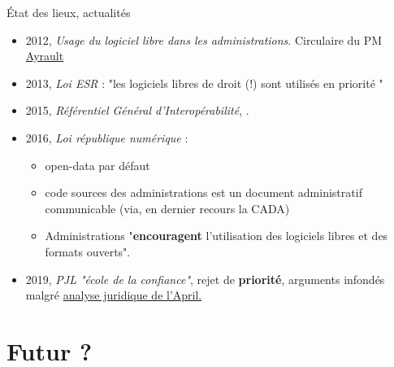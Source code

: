 \documentclass{beamer}
\begin{document}
\begin{frame}{État des lieux, actualités}

  \begin{itemize}
  \item 2012, \textit{Usage du logiciel libre dans les
      administrations}. Circulaire du PM
    \href{http://circulaire.legifrance.gouv.fr/pdf/2012/09/cir_35837.pdf}{{\color{blue}Ayrault}}
  \item 2013, \textit{Loi ESR} : "les logiciels libres de droit (!)
    sont utilisés en priorité "
  \item 2015, \textit{Référentiel Général d'Interopérabilité},
    \href{http://references.modernisation.gouv.fr/sites/default/files/Referentiel_General_Interoperabilite_V2.pdf}{\color{blue}{RGIv2}}.
  \item 2016, \textit{Loi république numérique} :
    \begin{itemize}
    \item open-data par défaut
    \item code sources des administrations est un document
      administratif communicable (via, en dernier recours la CADA)
    \item Administrations "\textbf{encouragent} l'utilisation des
      logiciels libres et des formats ouverts".
    \end{itemize}
  \item 2019, \textit{PJL "école de la confiance"}, rejet de
    \textbf{priorité}, arguments infondés malgré
    \href{https://www.april.org/sites/default/files/20130612-note-legalite-disposition-legislative.pdf}{{\color{blue}analyse
        juridique de l'April.}}

  \end{itemize}

  
\end{frame}


\section{Futur ?}
\end{document}
